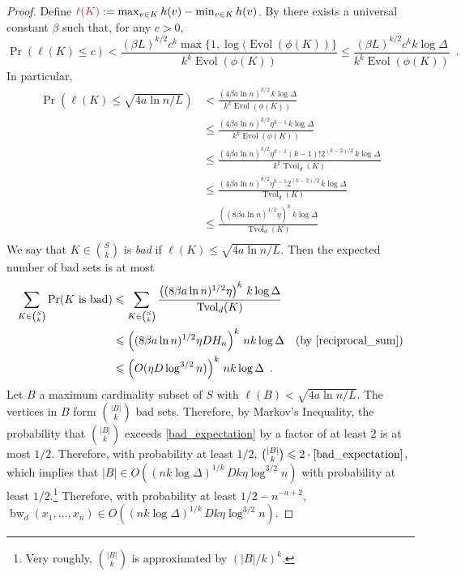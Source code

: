 \documentclass{patmorin}
\makeatletter
\renewcommand{\le}{\leqslant}
\newcommand{\defin}[1]{\emph{\textcolor{brightmaroon}{#1}}}
\def\mathcolor#1#{\@mathcolor{#1}}
\def\@mathcolor#1#2#3{%
  \protect\leavevmode
  \begingroup
    \color#1{#2}#3%
  \endgroup
}
\newcommand{\mathdefin}[1]{\mathcolor{brightmaroon}{#1}}
\DeclareMathOperator{\bw}{bw}
\DeclareMathOperator{\evol}{Evol}
\DeclareMathOperator{\tvol}{Tvol}
\makeatother
\begin{document}
\begin{proof}
  Define $\mathdefin{\ell(K)}:=\max_{v\in K}h(v)-\min_{v\in K} h(v)$.  By \cite[Theorem~9]{feige:approximating} there exists a universal constant $\beta$ such that, for any $c>0$,
  \[
      \Pr(\ell(K) \le c)
        < \frac{(\beta L)^{k/2}c^k\max\{1,\log(\evol(\phi(K))\}}{k^k\evol(\phi(K))}
        \le \frac{(\beta L)^{k/2}c^kk\log\Delta}{k^k\evol(\phi(K))} \enspace .
  \]
  In particular,
  \begin{align*}
    \Pr(\ell(K) \le \sqrt{4a\ln n/L})
      & <
      \frac{(4\beta a\ln n)^{k/2}\, k\log\Delta}{k^k\evol(\phi(K))} \\
      & \le \frac{(4\beta a\ln n)^{k/2}\eta^{k-1}\, k\log\Delta}{k^k\evol(\phi(K))} \\
      & \le \frac{(4\beta a\ln n)^{k/2}\eta^{k-1}(k-1)!2^{(k-2)/2}\, k\log\Delta}{k^k\tvol_{d}(K)} \\
      & \le \frac{(4\beta a\ln n)^{k/2}\eta^{k-1}2^{(k-2)/2}\,k\log\Delta}{\tvol_{d}(K)} \\
      & \le \frac{\left((8\beta a\ln n)^{1/2}\eta\right)^{k}\,k\log\Delta}{\tvol_{d}(K)} \\
  \end{align*}
  We say that $K\in\binom{S}{k}$ is \defin{bad} if $\ell(K) \le \sqrt{4a\ln n/L}$. Then the expected number of bad sets is at most
  \begin{align}
    \sum_{K\in \binom{S}{k}} \Pr(\text{$K$ is bad})
    & \le \sum_{K\in \binom{S}{k}} \frac{\left((8\beta a\ln n)^{1/2}\eta\right)^{k}\, k\log\Delta}{\tvol_{d}(K)} \notag \\
    & \le \left((8\beta a\ln n)^{1/2}\eta DH_n\right)^{k}\, nk\log\Delta
    & \text{(by \cref{reciprocal_sum})} \notag \\
    & \le \left(O(\eta D\log^{3/2}n)\right)^{k}\, nk\log\Delta \enspace .
    \label{bad_expectation}
  \end{align}
  Let $B$ a maximum cardinality subset of $S$ with $\ell(B)<\sqrt{4a\ln n/L}$.  The vertices in $B$ form $\binom{|B|}{k}$ bad sets. Therefore, by Markov's Inequality, the probability that $\binom{|B|}{k}$ exceeds \eqref{bad_expectation} by a factor of at least $2$ is at most $1/2$.  Therefore, with probability at least $1/2$, $\binom{|B|}{k}\le 2\cdot\eqref{bad_expectation}$, which implies that $|B|\in O((nk\log\Delta)^{1/k}\,Dk\eta\log^{3/2} n)$ with probability at least $1/2$.\footnote{Very roughly, $\binom{|B|}{k}$ is approximated by $(|B|/k)^k$.}  Therefore, with probability at least $1/2-n^{-a+2}$, $\bw_d(x_1,\ldots,x_n)\in O((nk\log\Delta)^{1/k}\,Dk\eta\log^{3/2} n)$.
\end{proof}
\end{document}
